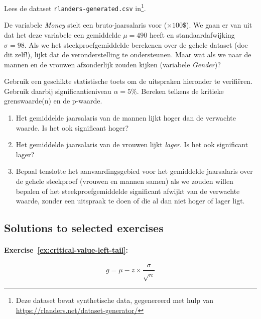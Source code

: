 \begin{exercise}
  \label{ex:z-toets-rlanders}
  Lees de dataset \texttt{rlanders-generated.csv} in\footnote{Deze dataset bevat synthetische data, gegenereerd met hulp van \url{https://rlanders.net/dataset-generator/}}.
  
  De variabele \emph{Money} stelt een bruto-jaarsalaris voor ($\times 100\$$). We gaan er van uit dat het deze variabele een gemiddelde $\mu = 490$ heeft en standaardafwijking $\sigma = 98$. Als we het steekproefgemiddelde berekenen over de gehele dataset (doe dit zelf!), lijkt dat de veronderstelling te ondersteunen. Maar wat als we naar de mannen en de vrouwen afzonderlijk zouden kijken (variabele \emph{Gender})?
  
  Gebruik een geschikte statistische toets om de uitspraken hieronder te verifiëren. Gebruik daarbij significantieniveau $\alpha = 5\%$. Bereken telkens de kritieke grenswaarde(n) en de p-waarde.
  
  \begin{enumerate}
    \item Het gemiddelde jaarsalaris van de mannen lijkt hoger dan de verwachte waarde. Is het ook significant hoger?
    \item Het gemiddelde jaarsalaris van de vrouwen lijkt \emph{lager}. Is het ook significant lager?
    \item Bepaal tenslotte het aanvaardingsgebied voor het gemiddelde jaarsalaris over de gehele steekproef (vrouwen en mannen samen) als we zouden willen bepalen of het steekproefgemiddelde significant afwijkt van de verwachte waarde, zonder een uitspraak te doen of die al dan niet hoger of lager ligt.
  \end{enumerate}
  
\end{exercise}

\subsection{Solutions to selected exercises}
\label{sec:testing-procedures-solutions}

\paragraph{Exercise~\ref{ex:critical-value-left-tail}:}

\begin{equation}
g = \mu - z \times \frac{\sigma}{\sqrt{n}}
\label{eq:kritiekeRechtseWaarde2}
\end{equation}

